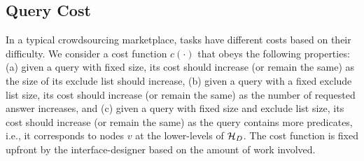 \subsection{Query Cost} 
In a typical crowdsourcing marketplace, tasks have different costs based on their difficulty. We consider a cost function $c(\cdot)$ that obeys the following properties:  (a) given a query with fixed size, its cost should increase (or remain the same) as the size of its exclude list should increase, (b) given a query with a fixed exclude list size, its cost should increase (or remain the same) as the number of requested answer increases, and (c) given a query with fixed size and exclude list size, its cost should increase (or remain the same) as the query contains more predicates, i.e., it corresponds to nodes $v$ at the lower-levels of $\mathcal{H}_D$. The cost function is fixed upfront by the interface-designer based on the amount of work involved.

